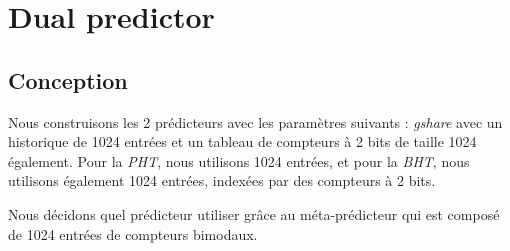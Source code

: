 \documentclass[a4paper]{article}
\begin{document}
\section{Dual predictor}
\subsection{Conception}
Nous construisons les 2 prédicteurs avec les paramètres suivants : \textit{gshare} avec un historique de 1024 entrées et un tableau de compteurs à 2 bits de taille 1024 également. 
Pour la \textit{PHT}, nous utilisons 1024 entrées, et pour la \textit{BHT}, nous utilisons également 1024 entrées, indexées par des compteurs à 2 bits.

Nous décidons quel prédicteur utiliser grâce au méta-prédicteur qui est composé de 1024 entrées de compteurs bimodaux.
\end{document}
